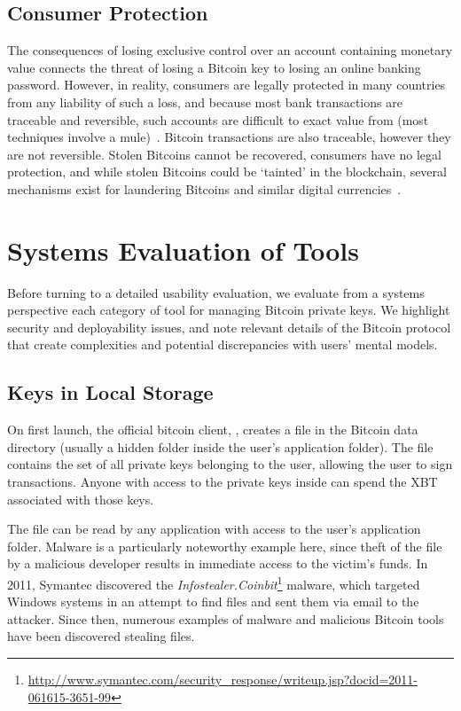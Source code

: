 \subsection{Consumer Protection} 

The consequences of losing exclusive control over an account containing monetary value connects the threat of losing a Bitcoin key to losing an online banking password. However, in reality, consumers are legally protected in many countries from any liability of such a loss, and because most bank transactions are traceable and reversible, such accounts are difficult to exact value from (most techniques involve a mule)~\cite{FH12}. Bitcoin transactions are also traceable, however they are not reversible. Stolen Bitcoins cannot be recovered, consumers have no legal protection, and while stolen Bitcoins could be `tainted' in the blockchain, several mechanisms exist for laundering Bitcoins and similar digital currencies~\cite{MGGR13,BNMC+14}.



\section{Systems Evaluation of Tools} 

Before turning to a detailed usability evaluation, we evaluate from a systems perspective each category of tool for managing Bitcoin private keys. We highlight security and deployability issues, and note relevant details of the Bitcoin protocol that create complexities and potential discrepancies with users' mental models.

\subsection{Keys in Local Storage}
On first launch, the official bitcoin client, \bitcoinclient, creates a \walletfile file in the Bitcoin data directory (usually a hidden folder inside the user's application folder). The \walletfile file contains the set of all private keys belonging to the user, allowing the user to sign transactions. Anyone with access to the private keys inside \walletfile can spend the XBT associated with those keys.

The \walletfile file can be read by any application with access to the user's application folder. Malware is a particularly noteworthy example here, since theft of the \walletfile file by a malicious developer results in immediate access to the victim's funds. In 2011, Symantec discovered the \textit{Infostealer.Coinbit}\footnote{\url{http://www.symantec.com/security_response/writeup.jsp?docid=2011-061615-3651-99}} malware, which targeted Windows systems in an attempt to find \walletfile files and sent them via email to the attacker. Since then, numerous examples of malware and malicious Bitcoin tools have been discovered stealing \walletfile files. 

